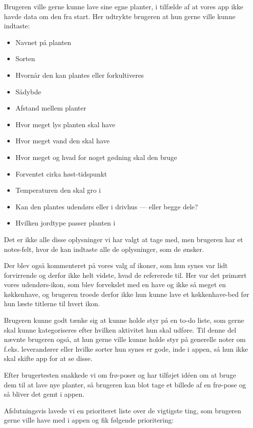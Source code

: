 Brugeren ville gerne kunne lave sine egne planter, i tilfælde af at vores app ikke havde data om den fra start. Her udtrykte brugeren at hun gerne ville kunne indtaste:

\begin{itemize}
    \item Navnet på planten
    \item Sorten
    \item Hvornår den kan plantes eller forkultiveres
    \item Sådybde
    \item Afstand mellem planter
    \item Hvor meget lys planten skal have
    \item Hvor meget vand den skal have
    \item Hvor meget og hvad for noget gødning skal den bruge
    \item Forventet cirka høst-tidspunkt
    \item Temperaturen den skal gro i
    \item Kan den plantes udendørs eller i drivhus --- eller begge dele?
    \item Hvilken jordtype passer planten i
\end{itemize}

Det er ikke alle disse oplysninger vi har valgt at tage med, men brugeren har et notes-felt, hvor de kan indtaste alle de oplysninger, som de ønsker.

Der blev også kommenteret på vores valg af ikoner, som hun synes var lidt forvirrende og derfor ikke helt vidste, hvad de refererede til. Her var det primært vores udendørs-ikon, som blev forvekslet med en have og ikke så meget en køkkenhave, og brugeren troede derfor ikke hun kunne lave et køkkenhave-bed før hun læste titlerne til hvert ikon.

Brugeren kunne godt tænke sig at kunne holde styr på en to-do liste, som gerne skal kunne kategoriseres efter hvilken aktivitet hun skal udføre. Til denne del nævnte brugeren også, at hun gerne ville kunne holde styr på generelle noter om f.eks. leverandører eller hvilke sorter hun synes er gode, inde i appen, så hun ikke skal skifte app for at se disse.

Efter brugertesten snakkede vi om frø-poser og har tilføjet idéen om at bruge dem til at lave nye planter, så brugeren kan blot tage et billede af en frø-pose og så bliver det gemt i appen.

Afslutningsvis lavede vi en prioriteret liste over de vigtigste ting, som brugeren gerne ville have med i appen og fik følgende prioritering:

